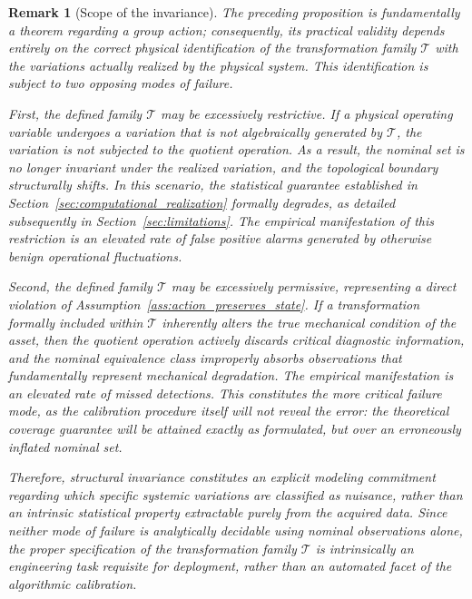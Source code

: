 \documentclass[a4paper]{cas-sc}
\newtheorem{remark}{Remark}
\begin{document}
\begin{remark}[Scope of the invariance]
\label{rem:boundary_invariance_scope}
The preceding proposition is fundamentally a theorem regarding a group action; consequently, its practical validity depends entirely on the correct physical identification of the transformation family \(\mathcal{T}\) with the variations actually realized by the physical system. This identification is subject to two opposing modes of failure.

First, the defined family \(\mathcal{T}\) may be excessively restrictive. If a physical operating variable undergoes a variation that is not algebraically generated by \(\mathcal{T}\), the variation is not subjected to the quotient operation. As a result, the nominal set is no longer invariant under the realized variation, and the topological boundary structurally shifts. In this scenario, the statistical guarantee established in Section~\ref{sec:computational_realization} formally degrades, as detailed subsequently in Section~\ref{sec:limitations}. The empirical manifestation of this restriction is an elevated rate of false positive alarms generated by otherwise benign operational fluctuations.

Second, the defined family \(\mathcal{T}\) may be excessively permissive, representing a direct violation of Assumption~\ref{ass:action_preserves_state}. If a transformation formally included within \(\mathcal{T}\) inherently alters the true mechanical condition of the asset, then the quotient operation actively discards critical diagnostic information, and the nominal equivalence class improperly absorbs observations that fundamentally represent mechanical degradation. The empirical manifestation is an elevated rate of missed detections. This constitutes the more critical failure mode, as the calibration procedure itself will not reveal the error: the theoretical coverage guarantee will be attained exactly as formulated, but over an erroneously inflated nominal set.

Therefore, structural invariance constitutes an explicit modeling commitment regarding which specific systemic variations are classified as nuisance, rather than an intrinsic statistical property extractable purely from the acquired data. Since neither mode of failure is analytically decidable using nominal observations alone, the proper specification of the transformation family \(\mathcal{T}\) is intrinsically an engineering task requisite for deployment, rather than an automated facet of the algorithmic calibration.
\end{remark}
\end{document}
